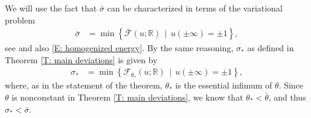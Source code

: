 \documentclass[10pt,a4paper]{amsart}
\begin{document}
We will use the fact that $ \bar\sigma $ can be characterized in terms of the variational problem
%
\begin{align}
		\bar\sigma &= \min \left\{ \bar{\mathscr{F}}(u;\mathbb{R}) \, \mid \, u(\pm \infty) = \pm 1 \right\}, \label{eqn:bar-sigma}
\end{align}
%
see \cite[(3.5)]{AlbertiLectureNotes} and also \eqref{E: homogenized energy}. By the same reasoning, $ \sigma_* $ as defined in Theorem \ref{T: main deviations} is given by
%
\begin{align} \label{E: lower energy variational formula}
		\sigma_*&= \min \left\{ \mathscr{F}_{\theta_{*}}(u;\mathbb{R}) \, \mid \, u(\pm \infty) = \pm 1 \right\} ,
\end{align}
where, as in the statement of the theorem, $\theta_{*}$ is the essential infimum of $\theta$.
%
Since $\theta$ is nonconstant in Theorem \ref{T: main deviations}, we know that $ \theta_* < \bar\theta $, and thus $ \sigma_* < \bar\sigma $.
 
\end{document}
